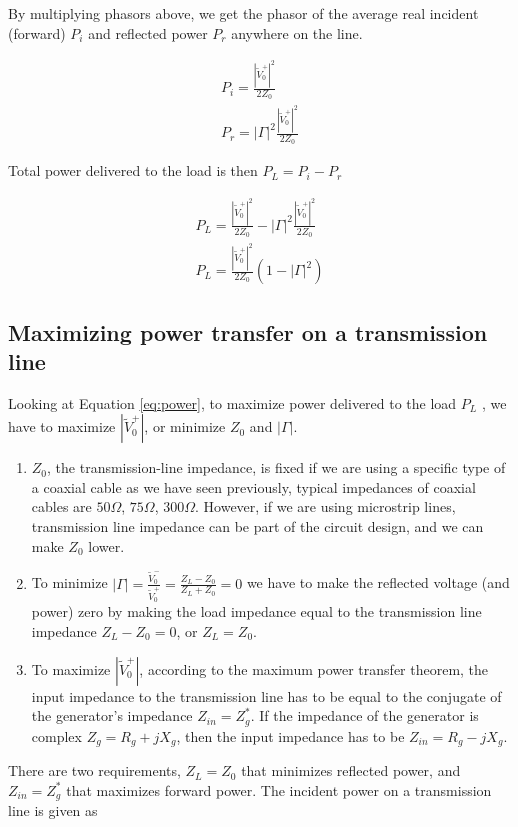 \documentclass{ximera}
\begin{document}
By multiplying phasors above, we get the phasor of the average real incident (forward) $P_i$ and reflected power $P_r$ anywhere on the line.

\begin{eqnarray}
P_i=\frac{|\tilde{V}_0^+|^2}{2 Z_0} \\
P_r= |\Gamma|^2 \frac{|\tilde{V}_0^+|^2}{2 Z_0}
\end{eqnarray}

Total power delivered to the load is then  $P_L=P_i-P_r$

\begin{eqnarray}
P_L=\frac{|\tilde{V}_0^+|^2}{2 Z_0} - |\Gamma|^2 \frac{|\tilde{V}_0^+|^2}{2 Z_0} \\
P_L=\frac{|\tilde{V}_0^+|^2}{2 Z_0} (1-|\Gamma|^2 ) \label{eq:power}
\end{eqnarray}


\subsection{Maximizing power transfer on a transmission line}

Looking at Equation \ref{eq:power}, to maximize power delivered to the load $P_L$  , we have to maximize $|\tilde{V}_0^+|$, or minimize $Z_0$ and $|\Gamma|$. 


\begin{enumerate}
\item $Z_0$, the transmission-line impedance, is fixed if we are using a specific type of a coaxial cable as we have seen previously, typical impedances of coaxial cables are $50\Omega$, $75\Omega$, $300\Omega$. However, if we are using microstrip lines,  transmission line impedance can be part of the circuit design, and we can make $Z_0$ lower.
\item To minimize $|\Gamma|=\frac{\tilde{V}_0^-}{\tilde{V}_0^+} =\frac{Z_L-Z_0}{Z_L+Z_0}=0$ we have to make the reflected voltage (and power) zero by making the load impedance equal to the transmission line impedance $Z_L-Z_0=0$, or $Z_L=Z_0$. 
\item To maximize $|\tilde{V}_0^+|$, according to the maximum power transfer theorem, the input impedance to the transmission line has to be equal to the conjugate of the generator's impedance $Z_{in}=Z_{g}^*$. If the impedance of the generator is complex $Z_g=R_g+jX_g$, then the input impedance has to be $Z_{in}=R_g-jX_g$.
\end{enumerate}

There are two requirements, $Z_L=Z_0$ that minimizes reflected power,  and $Z_{in}=Z_g^*$ that maximizes forward power. The incident power on a  transmission line is given as
\end{document}
